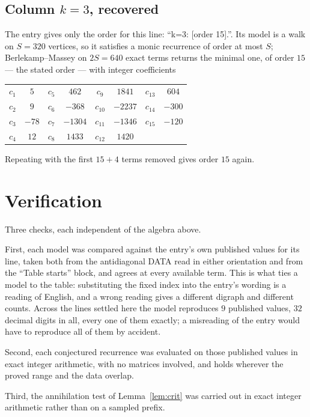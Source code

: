 \documentclass[11pt,a4paper]{article}
\theoremstyle{plain}
\theoremstyle{definition}
\begin{document}
\subsection*{Column $k=3$, recovered}
The entry gives only the order for this line: ``k=3: [order 15].''. Its model is a walk on
$S=320$ vertices, so it satisfies a monic recurrence of order at most $S$;
Berlekamp--Massey on $2S=640$ exact terms returns the minimal one, of order
$15$ --- the stated order --- with integer coefficients
\begin{center}\small\begin{tabular}{cccccccc}
$c_{1}$ & $5$ & $c_{5}$ & $462$ & $c_{9}$ & $1841$ & $c_{13}$ & $604$ \\
$c_{2}$ & $9$ & $c_{6}$ & $-368$ & $c_{10}$ & $-2237$ & $c_{14}$ & $-300$ \\
$c_{3}$ & $-78$ & $c_{7}$ & $-1304$ & $c_{11}$ & $-1346$ & $c_{15}$ & $-120$ \\
$c_{4}$ & $12$ & $c_{8}$ & $1433$ & $c_{12}$ & $1420$ &  &  \\
\end{tabular}\end{center}
Repeating with the first $15+4$ terms removed gives order $15$ again.

\section{Verification}

Three checks, each independent of the algebra above.

First, each model was compared against the entry's own published values for its line, taken
both from the antidiagonal DATA read in either orientation and from the ``Table starts''
block, and agrees at every available term. This is what ties a model to the table:
substituting the fixed index into the entry's wording is a reading of English, and a wrong
reading gives a different digraph and different counts. Across the lines settled here the
model reproduces $9$ published values, $32$ decimal digits in all, every one of
them exactly; a misreading of the entry would have to reproduce all of them by accident.

Second, each conjectured recurrence was evaluated on those published values in exact
integer arithmetic, with no matrices involved, and holds wherever the proved range and the
data overlap.

Third, the annihilation test of Lemma~\ref{lem:crit} was carried out in exact integer
arithmetic rather than on a sampled prefix.
\end{document}
